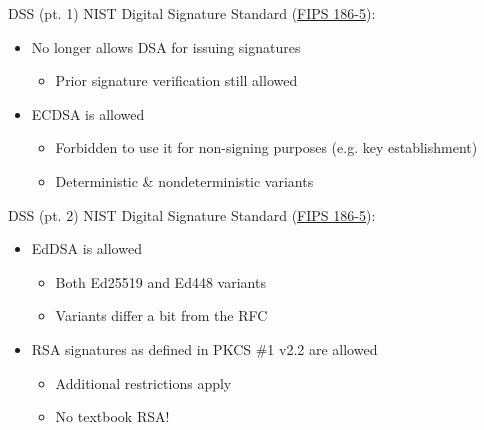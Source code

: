 \begin{frame}{DSS (pt. 1)}
  NIST Digital Signature Standard (\href{https://csrc.nist.gov/pubs/fips/186-5/final}{FIPS 186-5}):
  \begin{itemize}[<+(1)->]
    \item No longer allows DSA for issuing signatures
    \begin{itemize}
      \item Prior signature verification still allowed
    \end{itemize}
    \item ECDSA is allowed
    \begin{itemize}
      \item Forbidden to use it for non-signing purposes (e.g. key establishment)
      \item Deterministic \& nondeterministic variants
    \end{itemize}
  \end{itemize}
\end{frame}

\begin{frame}{DSS (pt. 2)}
  NIST Digital Signature Standard (\href{https://csrc.nist.gov/pubs/fips/186-5/final}{FIPS 186-5}):
  \begin{itemize}[<+(1)->]
    \item EdDSA is allowed
    \begin{itemize}
      \item Both Ed25519 and Ed448 variants
      \item Variants differ a bit from the RFC
    \end{itemize}
    \item RSA signatures as defined in PKCS \#1 v2.2 are allowed
    \begin{itemize}
      \item Additional restrictions apply
      \item No textbook RSA!
    \end{itemize}
  \end{itemize}
\end{frame}

